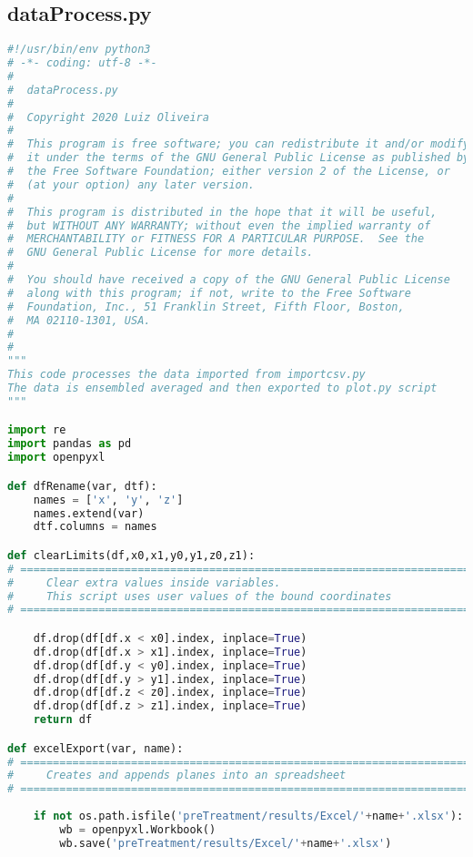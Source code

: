 \subsection{dataProcess.py}
\begin{lstlisting}[language=python]
#!/usr/bin/env python3
# -*- coding: utf-8 -*-
#
#  dataProcess.py
#  
#  Copyright 2020 Luiz Oliveira
#  
#  This program is free software; you can redistribute it and/or modify
#  it under the terms of the GNU General Public License as published by
#  the Free Software Foundation; either version 2 of the License, or
#  (at your option) any later version.
#  
#  This program is distributed in the hope that it will be useful,
#  but WITHOUT ANY WARRANTY; without even the implied warranty of
#  MERCHANTABILITY or FITNESS FOR A PARTICULAR PURPOSE.  See the
#  GNU General Public License for more details.
#  
#  You should have received a copy of the GNU General Public License
#  along with this program; if not, write to the Free Software
#  Foundation, Inc., 51 Franklin Street, Fifth Floor, Boston,
#  MA 02110-1301, USA.
#  
#  
"""
This code processes the data imported from importcsv.py
The data is ensembled averaged and then exported to plot.py script
"""

import re
import pandas as pd
import openpyxl

def dfRename(var, dtf):
    names = ['x', 'y', 'z']
    names.extend(var)
    dtf.columns = names

def clearLimits(df,x0,x1,y0,y1,z0,z1):
# =============================================================================
#     Clear extra values inside variables.
#     This script uses user values of the bound coordinates
# =============================================================================

    df.drop(df[df.x < x0].index, inplace=True)
    df.drop(df[df.x > x1].index, inplace=True)
    df.drop(df[df.y < y0].index, inplace=True)
    df.drop(df[df.y > y1].index, inplace=True)
    df.drop(df[df.z < z0].index, inplace=True)
    df.drop(df[df.z > z1].index, inplace=True)
    return df

def excelExport(var, name):
# =============================================================================
#     Creates and appends planes into an spreadsheet
# =============================================================================
    
    if not os.path.isfile('preTreatment/results/Excel/'+name+'.xlsx'):
        wb = openpyxl.Workbook()
        wb.save('preTreatment/results/Excel/'+name+'.xlsx')


\end{lstlisting}
